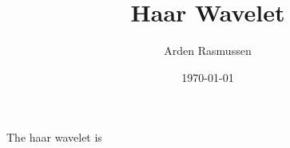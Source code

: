 \documentclass[12pt]{amsart}
\title{Haar Wavelet}
\author{Arden Rasmussen}
\date{\today}
\begin{document}
\maketitle

The haar wavelet is 
\end{document}
